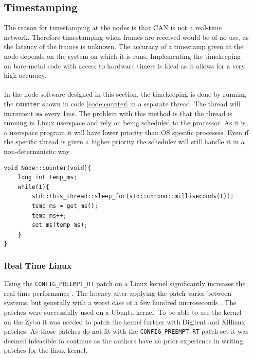 \subsection{Timestamping}\label{sec:time}
The reason for timestamping at the nodes is that CAN is not a real-time network.
Therefore timestamping when frames are received would be of no use, as the latency of the frames is unknown.
The accuracy of a timestamp given at the node depends on the system on which it is runs. 
Implementing the timekeeping on bare-metal code with access to hardware timers is ideal as it allows for a very high accuracy.
\\~\\
In the node software designed in this section, the timekeeping is done by running the \texttt{counter} shown in code \ref{code:counter} in a separate thread.
The thread will increment \texttt{ms} every 1ms.
The problem with this method is that the thread is running in Linux userspace and rely on being scheduled to the processor. 
As it is a userspace program it will have lower priority than OS specific processes.
Even if the specific thread is given a higher priority the scheduler will still handle it in a non-deterministic way.

\begin{lstlisting}[caption=Declaration of counter function.,label=code:counter]
void Node::counter(void){
	long int temp_ms;
	while(1){
		std::this_thread::sleep_for(std::chrono::milliseconds(1));
		temp_ms = get_ms();
		temp_ms++;
		set_ms(temp_ms);
	}
}
\end{lstlisting}

\subsubsection*{Real Time Linux}
Using the \texttt{CONFIG\_PREEMPT\_RT} patch on a Linux kernel significantly increases the real-time performance \cite{real_time_linux}.
The latency after applying the patch varies between systems, but generally with a worst case of a few hundred microseconds \cite{real_time_linux1}.
The patches were successfully used on a Ubuntu kernel.
To be able to use the kernel on the Zybo it was needed to patch the kernel further with Digilent and Xillinux patches.
As those patches do not fit with the \texttt{CONFIG\_PREEMPT\_RT} patch set it was deemed infeasible to continue as the authors have no prior experience in writing patches for the linux kernel. 
